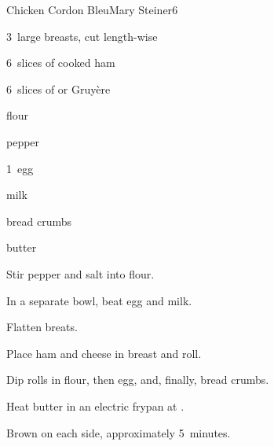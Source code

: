 \begin{recipe}{Chicken Cordon Bleu}{Mary Steiner}{6}

\begin{ingredients}
\item 3~large  breasts, cut length-wise
\item 6~slices of cooked ham
\item 6~slices of  or Gruy\`ere 
\item \C{\quarter} flour
\item {}
\item pepper
\item 1~egg
\item {} milk
\item {} bread crumbs
\item {} butter
\end{ingredients}

\begin{directions}
\item Stir pepper and salt into flour.
\item In a separate bowl, beat egg and milk.
\item Flatten breats.
\item Place ham and cheese in breast and roll.
\item Dip rolls in flour, then egg, and, finally, bread crumbs.
\item Heat butter in an electric frypan at .
\item Brown on each side, approximately 5~minutes.
\end{directions}

\end{recipe}
